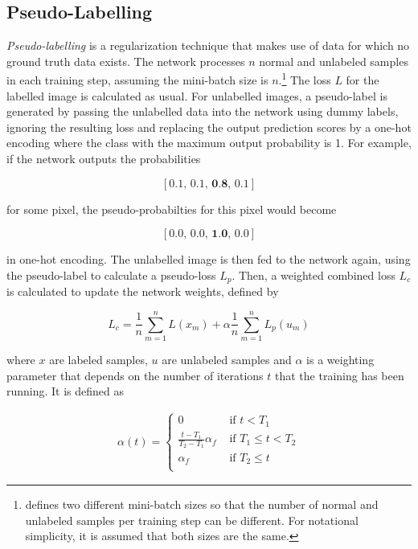 	\subsection {Pseudo-Labelling}
\label{subsec:pseudo_label}
\textit{Pseudo-labelling} \cite{pseudo_label} is a regularization technique that makes use of data for which no ground truth data exists. The network processes $n$ normal and unlabeled samples in each training step, assuming the mini-batch size is $n$.\footnote{\cite{pseudo_label} defines two different mini-batch sizes so that the number of normal and unlabeled samples per training step can be different. For notational simplicity, it is assumed that both sizes are the same.} The loss $L$ for the labelled image is calculated as usual. For unlabelled images, a pseudo-label is generated by passing the unlabelled data into the network using dummy labels, ignoring the resulting loss and replacing the output prediction scores by a one-hot encoding where the class with the maximum output probability is 1. For example, if the network outputs the probabilities 

\[ [0.1,\, 0.1,\, \textbf{0.8},\, 0.1] \]

\noindent for some pixel, the pseudo-probabilties for this pixel would become

\[ [0.0,\, 0.0,\, \textbf{1.0},\, 0.0] \]

\noindent in one-hot encoding. The unlabelled image is then fed to the network again, using the pseudo-label to calculate a pseudo-loss $L_p$. Then, a weighted combined loss $L_c$ is calculated to update the network weights, defined by

\[ L_c = \frac{1}{n} \sum \limits_{m=1}^{n} L(x_m) + \alpha \frac{1}{n} \sum \limits_{m=1}^{n} L_p(u_m)  \]

\noindent where $x$ are labeled samples, $u$ are unlabeled samples and $\alpha$ is a weighting parameter that depends on the number of iterations $t$ that the training has been running. It is defined as

\begin {align}
\alpha(t) = \begin{cases} 0 &\text{ if } t < T_1 \\
				\frac{t - T_1}{T_2 - T_1} \alpha_f &\text{ if } T_1 \leq t < T_2 \\
				\alpha_f &\text { if } T_2 \leq t \\
	        \end{cases}
\end {align}


